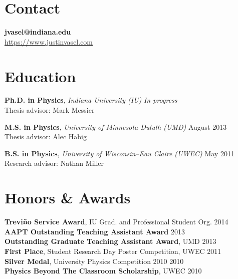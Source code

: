 \documentclass[11pt]{cv}
\begin{document}

\begin{cv}


\section{Contact}
\textbf{jvasel@indiana.edu} \\
\href{https://www.justinvasel.com}{https://www.justinvasel.com}


\section{Education}

\textbf{Ph.D. in Physics}, \emph{Indiana University (IU)} \hfill \emph{In progress} \\
Thesis advisor: Mark Messier

\textbf{M.S. in Physics}, \emph{University of Minnesota Duluth (UMD)} \hfill August 2013 \\
Thesis advisor: Alec Habig

\textbf{B.S. in Physics}, \emph{University of Wisconsin--Eau Claire (UWEC)} \hfill May 2011 \\
Research advisor: Nathan Miller


\section{Honors \& Awards}

\textbf{Trevi\~{n}o Service Award}, IU Grad. and Professional Student Org. \hfill 2014 \\
\textbf{AAPT Outstanding Teaching Assistant Award} \hfill 2013 \\
\textbf{Outstanding Graduate Teaching Assistant Award}, UMD \hfill 2013 \\
\textbf{First Place}, Student Research Day Poster Competition, UWEC \hfill 2011 \\
\textbf{Silver Medal}, University Physics Competition 2010 \hfill 2010 \\
\textbf{Physics Beyond The Classroom Scholarship}, UWEC \hfill 2010



\end{cv}
\end{document}
